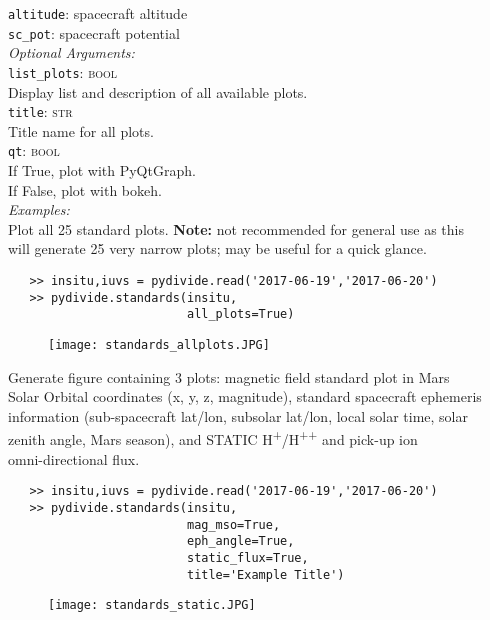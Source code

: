 \documentclass{article}
\begin{document}
\indent \indent \texttt{altitude}: spacecraft altitude\\
\indent \indent \texttt{sc\_pot}: spacecraft potential\\
\textit{Optional Arguments:}\\
\indent \texttt{list\_plots}: \textsc{bool}\\
\indent \indent Display list and description of all available plots.\\
\indent \texttt{title}: \textsc{str}\\
\indent \indent Title name for all plots.\\
\indent \texttt{qt}: \textsc{bool}\\
\indent \indent If True, plot with PyQtGraph.\\
\indent \indent If False, plot with bokeh.\\
\noindent \textit{Examples:}\\
\indent Plot all 25 standard plots. \textbf{Note:} not recommended for general use as this\\
\indent will generate 25 very narrow plots; may be useful for a quick glance.\\
\vspace{-10mm}
\begin{verbatim}
   >> insitu,iuvs = pydivide.read('2017-06-19','2017-06-20')
   >> pydivide.standards(insitu,
                         all_plots=True)
\end{verbatim}
\begin{figure}[H]
\centering
\texttt{[image: standards\_allplots.JPG]}
\end{figure}
\indent Generate figure containing 3 plots: magnetic field standard plot in Mars\\
\indent Solar Orbital coordinates (x, y, z, magnitude), standard spacecraft ephemeris\\
\indent information (sub-spacecraft lat/lon, subsolar lat/lon, local solar time, solar\\
\indent zenith angle, Mars season), and STATIC H\textsuperscript{+}/H\textsuperscript{++} and pick-up ion\\
\indent omni-directional flux.\\
\vspace{-10mm}
\begin{verbatim}
   >> insitu,iuvs = pydivide.read('2017-06-19','2017-06-20')
   >> pydivide.standards(insitu,
                         mag_mso=True,
                         eph_angle=True,
                         static_flux=True,
                         title='Example Title')
\end{verbatim}
\begin{figure}[H]
\centering
\texttt{[image: standards\_static.JPG]}
\end{figure}
\end{document}
